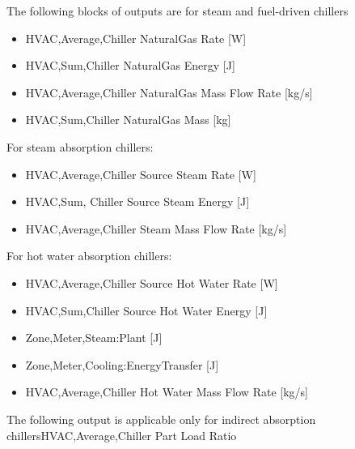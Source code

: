 The following blocks of outputs are for steam and fuel-driven chillers

\begin{itemize}
    \item
    HVAC,Average,Chiller NaturalGas Rate {[}W{]}
    \item
    HVAC,Sum,Chiller NaturalGas Energy {[}J{]}
    \item
    HVAC,Average,Chiller NaturalGas Mass Flow Rate {[}kg/s{]}
    \item
    HVAC,Sum,Chiller NaturalGas Mass {[}kg{]}
\end{itemize}

For steam absorption chillers:

\begin{itemize}
    \item
    HVAC,Average,Chiller Source Steam Rate {[}W{]}
    \item
    HVAC,Sum, Chiller Source Steam Energy {[}J{]}
    \item
    HVAC,Average,Chiller Steam Mass Flow Rate {[}kg/s{]}
\end{itemize}

For hot water absorption chillers:

\begin{itemize}
    \item
    HVAC,Average,Chiller Source Hot Water Rate {[}W{]}
    \item
    HVAC,Sum,Chiller Source Hot Water Energy {[}J{]}
    \item
    Zone,Meter,Steam:Plant {[}J{]}
    \item
    Zone,Meter,Cooling:EnergyTransfer {[}J{]}
    \item
    HVAC,Average,Chiller Hot Water Mass Flow Rate {[}kg/s{]}
\end{itemize}

The following output is applicable only for indirect absorption chillersHVAC,Average,Chiller Part Load Ratio

